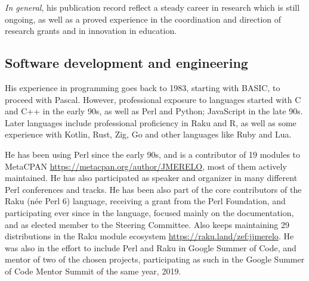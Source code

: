 \documentclass[a4paper,12pt]{article}
\begin{document}
{\em In general}, his publication record reflect a steady career in research
which is still ongoing, as well as a proved experience in the coordination and
direction of research grants and in innovation in education.

\subsection{Software development and engineering}

His experience in programming goes back to 1983, starting with BASIC, to proceed
with Pascal. However, professional exposure to languages started with C and C++
in the early 90s, as well as Perl and Python; JavaScript in the late 90s. Later
languages include professional proficiency in Raku and R, as well as some
experience with Kotlin, Rust, Zig, Go and other languages like Ruby and Lua.

He has been using Perl since the early 90s, and is a contributor of 19 modules
to MetaCPAN \url{https://metacpan.org/author/JMERELO}, most of them actively
maintained. He has also participated as speaker and organizer in many different
Perl conferences and tracks. He has been also part of the core contributors of
the Raku (née Perl 6) language, receiving a grant from the Perl Foundation, and
participating ever since in the language, focused mainly on the documentation,
and as elected member to the Steering Committee. Also keeps maintaining 29
distributions in the Raku module ecosystem
\url{https://raku.land/zef:jjmerelo}. He was also in the effort to include Perl
and Raku in Google Summer of Code, and mentor of two of the chosen projects,
participating as such in the Google Summer of Code Mentor Summit of the same
year, 2019.


\end{document}
